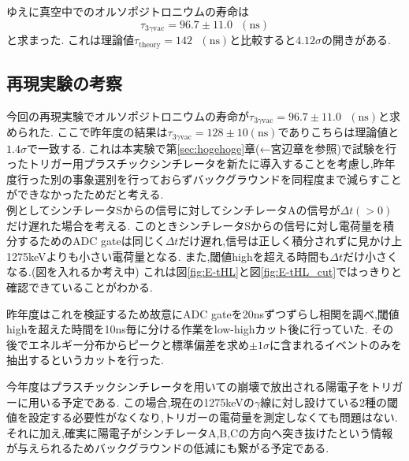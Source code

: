 ゆえに真空中でのオルソポジトロニウムの寿命は
\begin{equation}
	\nonumber
	\tau_{3\gamma\textrm{vac}}=96.7 \pm 11.0\hspace{8pt}(\textrm{ns})
\end{equation}
と求まった.
これは理論値$\tau_\textrm{theory}=142\hspace{8pt}(\textrm{ns})$と比較すると$4.12\sigma$の開きがある.

\subsection{再現実験の考察}
今回の再現実験でオルソポジトロニウムの寿命が$\tau_{3\gamma\textrm{vac}}=96.7 \pm 11.0\hspace{8pt}(\textrm{ns})$と求められた.
ここで昨年度の結果は$\tau_{3\gamma\textrm{vac}}=128 \pm 10(\textrm{ns})$でありこちらは理論値と$1.4\sigma$で一致する.
これは本実験で第\ref{sec:hogehoge}章(←宮辺章を参照)で試験を行ったトリガー用プラスチックシンチレータを新たに導入することを考慮し,昨年度行った別の事象選別を行っておらずバックグラウンドを同程度まで減らすことができなかったためだと考える. \\

例としてシンチレータSからの信号に対してシンチレータAの信号が$\Delta t(>0)$だけ遅れた場合を考える.
このときシンチレータSからの信号に対し電荷量を積分するためのADC gateは同じく$\Delta t$だけ遅れ,信号は正しく積分されずに見かけ上1275keVよりも小さい電荷量となる.
また,閾値highを超える時間も$\Delta t$だけ小さくなる.(図を入れるか考え中)
これは図\ref{fig:E-tHL}と図\ref{fig:E-tHL_cut}ではっきりと確認できていることがわかる.

昨年度はこれを検証するため故意にADC gateを20nsずつずらし相関を調べ,閾値highを超えた時間を10ns毎に分ける作業をlow-highカット後に行っていた.
その後でエネルギー分布からピークと標準偏差を求め$\pm 1\sigma$に含まれるイベントのみを抽出するというカットを行った.

今年度はプラスチックシンチレータを用いての崩壊で放出される陽電子をトリガーに用いる予定である.
この場合,現在の1275keVの$\gamma$線に対し設けている2種の閾値を設定する必要性がなくなり,トリガーの電荷量を測定しなくても問題はない.
それに加え,確実に陽電子がシンチレータA,B,Cの方向へ突き抜けたという情報が与えられるためバックグラウンドの低減にも繋がる予定である.
